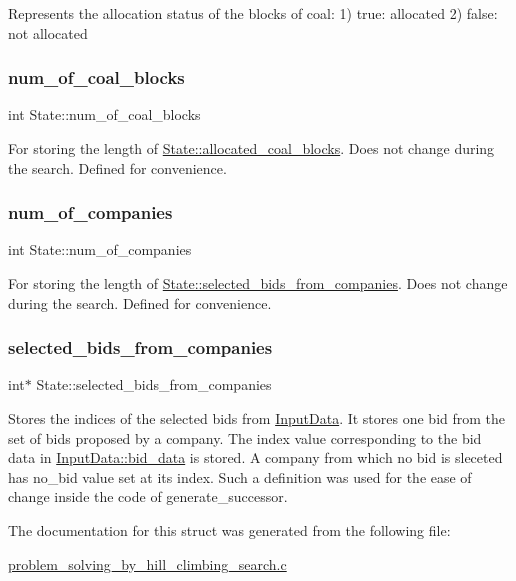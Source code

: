 Represents the allocation status of the blocks of coal\+: 1) true\+: allocated 2) false\+: not allocated \mbox{\label{structState_a9d0176a5edaf8f81c9e69bc3e1579f04}} 
\subsubsection{\texorpdfstring{num\+\_\+of\+\_\+coal\+\_\+blocks}{num\_of\_coal\_blocks}}
{\footnotesize\ttfamily int State\+::num\+\_\+of\+\_\+coal\+\_\+blocks}

For storing the length of \hyperlink{structState_a9b7fe730b545c321dec2897f8c3c8cbf}{State\+::allocated\+\_\+coal\+\_\+blocks}. Does not change during the search. Defined for convenience. \mbox{\label{structState_aff5c814b2070259023644917cc7bdd2e}} 
\subsubsection{\texorpdfstring{num\+\_\+of\+\_\+companies}{num\_of\_companies}}
{\footnotesize\ttfamily int State\+::num\+\_\+of\+\_\+companies}

For storing the length of \hyperlink{structState_a52cd42ec679f0af76c92ff88d7a079a0}{State\+::selected\+\_\+bids\+\_\+from\+\_\+companies}. Does not change during the search. Defined for convenience. \mbox{\label{structState_a52cd42ec679f0af76c92ff88d7a079a0}} 
\subsubsection{\texorpdfstring{selected\+\_\+bids\+\_\+from\+\_\+companies}{selected\_bids\_from\_companies}}
{\footnotesize\ttfamily int$\ast$ State\+::selected\+\_\+bids\+\_\+from\+\_\+companies}

Stores the indices of the selected bids from \hyperlink{structInputData}{Input\+Data}. It stores one bid from the set of bids proposed by a company. The index value corresponding to the bid data in \hyperlink{structInputData_a1dafb844546b53fd739be0f370676d28}{Input\+Data\+::bid\+\_\+data} is stored. A company from which no bid is sleceted has no\+\_\+bid value set at its index. Such a definition was used for the ease of change inside the code of generate\+\_\+successor. 

The documentation for this struct was generated from the following file\+:\begin{DoxyCompactItemize}
\item 
\hyperlink{problem__solving__by__hill__climbing__search_8c}{problem\+\_\+solving\+\_\+by\+\_\+hill\+\_\+climbing\+\_\+search.\+c}\end{DoxyCompactItemize}
